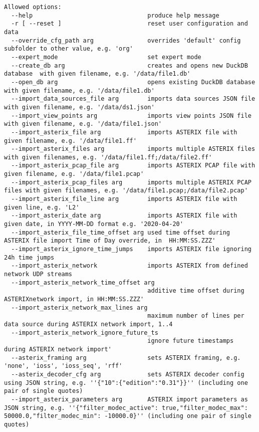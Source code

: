 \begin{lstlisting}
Allowed options:
  --help                                produce help message
  -r [ --reset ]                        reset user configuration and data
  --override_cfg_path arg               overrides 'default' config subfolder to other value, e.g. 'org'
  --expert_mode                         set expert mode
  --create_db arg                       creates and opens new DuckDB database  with given filename, e.g. '/data/file1.db'
  --open_db arg                         opens existing DuckDB database with given filename, e.g. '/data/file1.db'
  --import_data_sources_file arg        imports data sources JSON file with given filename, e.g. '/data/ds1.json'
  --import_view_points arg              imports view points JSON file with given filename, e.g. '/data/file1.json'
  --import_asterix_file arg             imports ASTERIX file with given filename, e.g. '/data/file1.ff'
  --import_asterix_files arg            imports multiple ASTERIX files with given filenames, e.g. '/data/file1.ff;/data/file2.ff'
  --import_asterix_pcap_file arg        imports ASTERIX PCAP file with given filename, e.g. '/data/file1.pcap'
  --import_asterix_pcap_files arg       imports multiple ASTERIX PCAP files with given filenames, e.g. '/data/file1.pcap;/data/file2.pcap'
  --import_asterix_file_line arg        imports ASTERIX file with given line, e.g. 'L2'
  --import_asterix_date arg             imports ASTERIX file with given date, in YYYY-MM-DD format e.g. '2020-04-20'
  --import_asterix_file_time_offset arg used time offset during ASTERIX file import Time of Day override, in  HH:MM:SS.ZZZ'
  --import_asterix_ignore_time_jumps    imports ASTERIX file ignoring 24h time jumps
  --import_asterix_network              imports ASTERIX from defined network UDP streams
  --import_asterix_network_time_offset arg
                                        additive time offset during ASTERIXnetwork import, in HH:MM:SS.ZZZ'
  --import_asterix_network_max_lines arg
                                        maximum number of lines per data source during ASTERIX network import, 1..4
  --import_asterix_network_ignore_future_ts 
                                        ignore future timestamps during ASTERIX network import'
  --asterix_framing arg                 sets ASTERIX framing, e.g. 'none', 'ioss', 'ioss_seq', 'rff'
  --asterix_decoder_cfg arg             sets ASTERIX decoder config using JSON string, e.g. ''{"10":{"edition":"0.31"}}'' (including one pair of single quotes)
  --import_asterix_parameters arg       ASTERIX import parameters as JSON string, e.g. ''{"filter_modec_active": true,"filter_modec_max": 50000.0,"filter_modec_min": -10000.0}'' (including one pair of single quotes)

\end{lstlisting}
